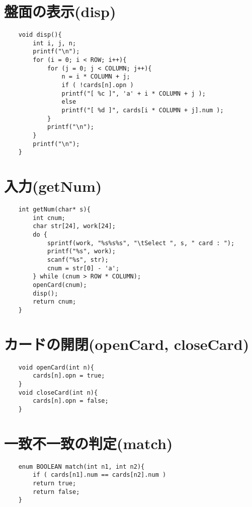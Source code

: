 \documentclass[uplatex,a4paper,11pt,oneside,openany]{jsarticle}
\begin{document}
\section{盤面の表示(disp)}

\begin{lstlisting}
	void disp(){
		int i, j, n;
		printf("\n");
		for (i = 0; i < ROW; i++){
			for (j = 0; j < COLUMN; j++){
				n = i * COLUMN + j;
				if ( !cards[n].opn )
				printf("[ %c ]", 'a' + i * COLUMN + j );
				else
				printf("[ %d ]", cards[i * COLUMN + j].num );
			}
			printf("\n");
		}
		printf("\n");
	}
\end{lstlisting}

\section{入力(getNum)}

\begin{lstlisting}
	int getNum(char* s){
		int cnum;
		char str[24], work[24];
		do {
			sprintf(work, "%s%s%s", "\tSelect ", s, " card : ");
			printf("%s", work);
			scanf("%s", str);
			cnum = str[0] - 'a';
		} while (cnum > ROW * COLUMN);
		openCard(cnum);
		disp();
		return cnum;
	}
\end{lstlisting}

\section{カードの開閉(openCard, closeCard)}

\begin{lstlisting}
	void openCard(int n){
		cards[n].opn = true;
	}
	void closeCard(int n){
		cards[n].opn = false;
	}
\end{lstlisting}

\section{一致不一致の判定(match)}

\begin{lstlisting}
	enum BOOLEAN match(int n1, int n2){
		if ( cards[n1].num == cards[n2].num )
		return true;
		return false;
	}
\end{lstlisting}
\end{document}
